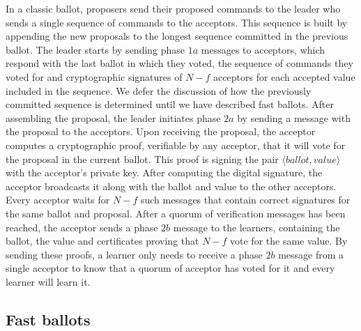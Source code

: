 In a classic ballot, proposers send their proposed commands to the leader who sends a single sequence of commands to the acceptors. This sequence is built by appending the new proposals to the longest sequence committed in the previous ballot. The leader starts by sending phase $1a$ messages to acceptors, which respond with the last ballot in which they voted, the sequence of commands they voted for and cryptographic signatures of $N-f$ acceptors for each accepted value included in the sequence. We defer the discussion of how the previously committed sequence is determined until we have described fast ballots. After assembling the proposal, the leader initiates phase $2a$ by sending a message with the proposal to the acceptors. Upon receiving the proposal, the acceptor computes a cryptographic proof, verifiable by any acceptor, that it will vote for the proposal in the current ballot. This proof is signing the pair $\langle ballot,value \rangle$ with the acceptor's private key. After computing the digital signature, the acceptor broadcasts it along with the ballot and value to the other acceptors. Every acceptor waits for $N-f$ such messages that contain correct signatures for the same ballot and proposal. After a quorum of verification messages has been reached, the acceptor sends a phase $2b$ message to the learners, containing the ballot, the value and certificates proving that $N-f$ vote for the same value. By sending these proofs, a learner only needs to receive a phase $2b$ message from a single acceptor to know that a quorum of acceptor has voted for it and every learner will learn it. \par

\subsection{Fast ballots} 

